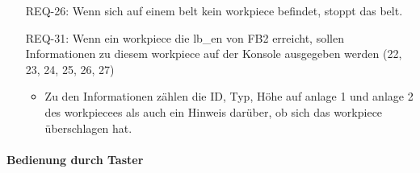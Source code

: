 \begin{itemize}
    \item[REQ-26:] Wenn sich auf einem \gls{belt} kein \gls{workpiece} befindet, stoppt das \gls{belt}.
    \item[REQ-31:] Wenn ein \gls{workpiece} die \gls{lb_en} von FB2 erreicht,
    sollen Informationen zu diesem \gls{workpiece} auf der Konsole ausgegeben werden (22, 23, 24, 25, 26, 27)
    \begin{itemize}
        \item Zu den Informationen zählen die ID, Typ, Höhe auf \gls{anlage} 1 und \gls{anlage} 2 des \gls{workpiece}es als
        auch ein Hinweis darüber, ob sich das \gls{workpiece} überschlagen hat.
    \end{itemize}
\end{itemize}

\paragraph{Bedienung durch Taster}
